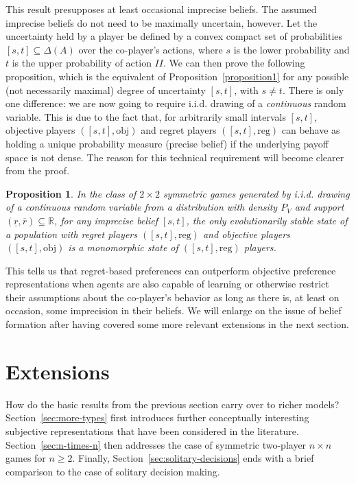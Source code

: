 \documentclass[fleqn,reqno,12pt]{article}
\theoremstyle{Satz}
\newtheorem{proposition}{Proposition}
\theoremstyle{Bsp}
\begin{document}
This result presupposes at least occasional imprecise beliefs. The assumed imprecise beliefs do not need to be maximally uncertain, however.  Let
the uncertainty held by a player be defined by a convex compact set of probabilities
$ [s,t] \subseteq \Delta(A) $ over the co-player's actions, where $s$ is the lower probability
and $t$ is the upper probability of action $II$.  We can then prove the following proposition,
which is the equivalent of Proposition~\ref{proposition1} for any possible (not necessarily
maximal) degree of uncertainty $[s,t]$, with $s \neq t$. There is only one difference: we are
now going to require i.i.d. drawing of a \emph{continuous} random variable. This is due to the
fact that, for arbitrarily small intervals $[s,t]$, objective players $([s,t],\text{obj})$ and
regret players $([s,t],\text{reg})$ can behave as holding a unique probability measure (precise
belief) if the underlying payoff space is not dense. The reason for this technical requirement
will become clearer from the proof.

\begin{proposition} \label{proposition2} In the class of $2\times2$ symmetric games generated
  by i.i.d. drawing of a continuous random variable from a distribution with density $P_V$ and
  support $(\underline{r},\overline{r}) \subseteq \mathbb{R}$, for any imprecise
  belief $[s,t]$, the only evolutionarily stable state of a population with regret players
  $([s,t],\text{reg})$ and objective players $([s,t],\text{obj})$ is a monomorphic state of
  $([s,t],\text{reg})$ players.
\end{proposition}

This tells us that regret-based preferences can outperform objective preference
representations when agents are also capable of learning or otherwise restrict their assumptions
about the co-player's behavior as long as there is, at least on occasion, some imprecision in
their beliefs. We will enlarge on the issue of belief formation after having covered some more
relevant extensions in the next section.

\section{Extensions}
\label{sec:extensions}

How do the basic results from the previous section carry over to richer models?
Section~\ref{sec:more-types} first introduces further conceptually interesting subjective
representations that have been considered in the literature. Section~\ref{sec:n-times-n} then
addresses the case of symmetric two-player $n \times n$ games for $n \ge 2$. Finally,
Section~\ref{sec:solitary-decisions} ends with a brief comparison to the case of solitary
decision making.
\end{document}
